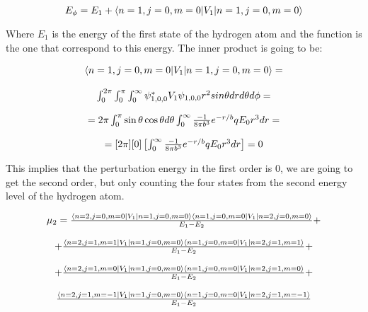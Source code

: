 \begin{equation}
  E_\phi = E_1 + \langle n=1,j=0,m=0\rvert V_1 \lvert n=1,j=0,m=0\rangle
\end{equation}

Where $E_1$ is the energy of the first state of the hydrogen atom and the function is the one that correspond to this energy. The inner product is going to be:

\begin{equation}
\begin{array}{c}
  \langle n=1,j=0,m=0\rvert V_1 \lvert n=1,j=0,m=0\rangle =
  \\

  \\
  \int_{0}^{2\pi} \int_{0}^{\pi} \int_{0}^{\infty} \psi_{1,0,0}^* V_1 \psi_{1,0,0} r^2 sin\theta dr d\theta d\phi =
  \\

  \\
  = 2\pi \int_{0}^{\pi}  \sin\theta\cos\theta d\theta \int_{0}^{\infty}\frac{-1}{8\pi b^3} e^{-r/b} q E_0 r^3 dr =
  \\

  \\
  = [2 \pi] [0] \left[\int_{0}^{\infty}\frac{-1}{8\pi b^3} e^{-r/b} q E_0 r^3 dr\right] = 0
\end{array}
\end{equation}

This implies that the perturbation energy in the first order is 0, we are going to get the second order, but only counting the four states from the second energy level of the hydrogen atom. 

\begin{equation}
  \begin{array}{c}
  \mu_2 = \frac{\langle n=2,j=0,m=0\rvert V_1 \lvert n=1,j=0,m=0\rangle\langle n=1,j=0,m=0\rvert V_1 \lvert n=2,j=0,m=0\rangle}{E_1-E_2} +
  \\

  \\
  + \frac{\langle n=2,j=1,m=1\rvert V_1 \lvert n=1,j=0,m=0\rangle\langle n=1,j=0,m=0\rvert V_1 \lvert n=2,j=1,m=1\rangle}{E_1-E_2} +
  \\

  \\
  + \frac{\langle n=2,j=1,m=0\rvert V_1 \lvert n=1,j=0,m=0\rangle\langle n=1,j=0,m=0\rvert V_1 \lvert n=2,j=1,m=0\rangle}{E_1-E_2} +
  \\

  \\
  \frac{\langle n=2,j=1,m=-1\rvert V_1 \lvert n=1,j=0,m=0\rangle\langle n=1,j=0,m=0\rvert V_1 \lvert n=2,j=1,m=-1\rangle}{E_1-E_2}
  \end{array}
\end{equation}

